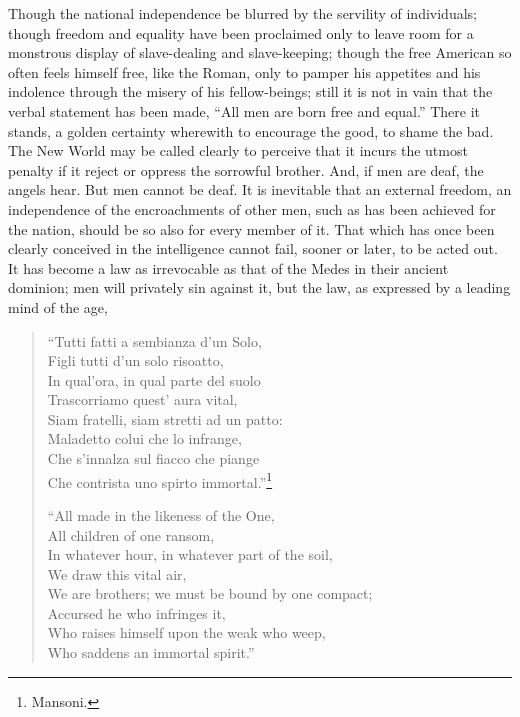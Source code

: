 Though the national independence be blurred by the servility of
individuals; though freedom and equality have been proclaimed only to
leave room for a monstrous display of slave-dealing and slave-keeping;
though the  free American so often feels himself free, like
the Roman, only to pamper his appetites and his indolence through the
misery of his fellow-beings; still it is not in vain that the verbal
statement has been made, ``All men are born free and equal.'' There it
stands, a golden certainty wherewith to encourage the good, to shame
the bad. The New World may be called clearly to perceive that it
incurs the utmost penalty if it reject or oppress the sorrowful
brother. And, if men are deaf, the angels hear. But men cannot be
deaf. It is inevitable that an external freedom, an independence of
the encroachments of other men, such as has been achieved for the
nation, should be so also for every member of it. That which has once
been clearly conceived in the intelligence cannot fail, sooner or
later, to be acted out. It has become a law as irrevocable as that of
the Medes in their ancient dominion; men will privately sin against
it, but the law, as expressed by a leading mind of the age,

\begin{verse}
``Tutti fatti a sembianza d'un Solo,\\
Figli tutti d'un solo risoatto,\\
In qual'ora, in qual parte del suolo\\
Trascorriamo quest' aura vital,\\
Siam fratelli, siam stretti ad un patto:\\
Maladetto colui che lo infrange,\\
Che s'innalza sul fiacco che piange\\
Che contrista uno spirto immortal.''\footnote{Mansoni.}

``All made in the likeness of the One,\\
\vin All children of one ransom,\\
In whatever hour, in whatever part of the soil,\\
\vin We draw this vital air,\\
We are brothers; we must be bound by one compact;\\
\vin Accursed he who infringes it,\\
Who raises himself upon the weak who weep,\\
\vin Who saddens an immortal spirit.''
\end{verse}

